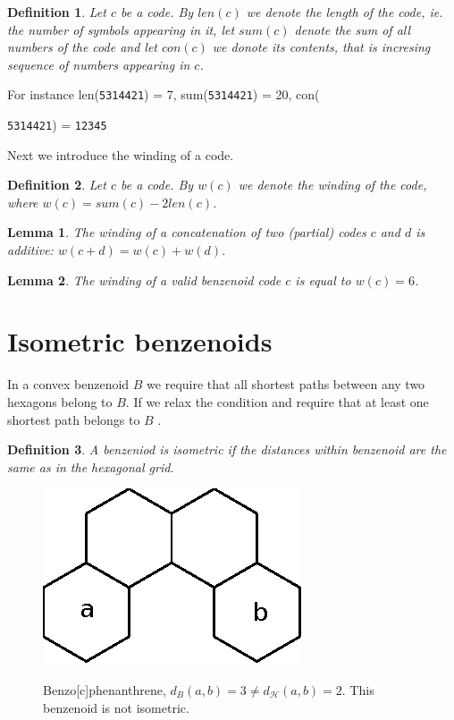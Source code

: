 \documentclass[a4paper,10pt]{article}
\newcounter{theorem}
\newtheorem{definition}{Definition}[section]
\newtheorem{lemma}{Lemma}[theorem]
\newcommand\Tomo[1]{\textcolor{brown}{Tomo: #1}}
\begin{document}
\begin{definition}
Let $c$ be a code. By $len(c)$ we denote the length of the code, ie. the number of symbols appearing in it, let $sum(c)$ denote the sum of all numbers of the code and let $con(c)$ we donote its \emph{contents}, that is incresing sequence of numbers appearing in $c$.
\end{definition}
For instance len({\tt 5314421}) = 7, sum({\tt 5314421}) = 20, con({{\tt 5314421}) = {\tt 12345}

Next we introduce the winding of a code.
\begin{definition}
Let $c$ be a code. By $w(c)$ we denote the winding of the code, where $w(c) = sum(c)-2len(c)$.
\end{definition}

\begin{lemma}
The winding of a concatenation of two (partial) codes $c$  and $d$ is additive: $w(c+d) = w(c)+w(d)$. 
\end{lemma}

\begin{lemma}
The winding of a valid benzenoid code $c$ is equal to $w(c) = 6$. 
\end{lemma}



\section{Isometric benzenoids}

In a convex benzenoid $B$ we require that all shortest paths between any two hexagons belong to $B$. If we relax the condition and require that at least one shortest path belongs to $B$ .

\begin{definition}
\label{def:isometric}
A benzeniod is isometric if the distances within benzenoid are the same as in the hexagonal grid.
\end{definition}



\begin{figure}
\centering
 \includegraphics{figures/fig2}
 \label{fig2}
 \caption{Benzo[c]phenanthrene, $d_B(a, b) = 3 \neq d_{\mathcal{H}}(a, b) = 2$. This benzenoid is not isometric.}
\end{figure}

}
\end{document}
